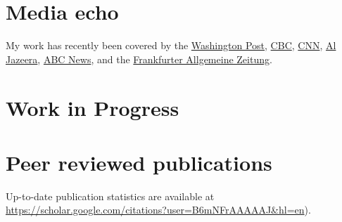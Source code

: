 \documentclass[11pt,a4paper,sans]{moderncv}
\begin{document}


\section{Media echo}

My work has recently been covered by the \href{https://www.washingtonpost.com/climate-environment/2021/10/11/85-percent-population-climate-impacts/}{Washington Post}, \href{https://www.cbc.ca/news/science/global-south-climate-science-1.6212471}{CBC}, \href{https://edition.cnn.com/2021/10/11/world/climate-change-attribution-gap/index.html}{CNN}, \href{https://www.aljazeera.com/news/2021/10/11/climate-change-may-already-affect-85-percent-of-humanity-report}{Al Jazeera}, \href{https://abcnews.go.com/US/human-induced-climate-change-affect-85-global-population/story?id=80523851}{ABC News}, and the \href{https://www.faz.net/aktuell/wissen/erde-klima/kuenstliche-intelligenz-zeigt-weltweite-auswirkungen-des-klimawandels-17613824.html}{Frankfurter Allgemeine Zeitung}.

\section{Work in Progress}




\section{Peer reviewed publications}

 Up-to-date publication statistics are available at  \url{https://scholar.google.com/citations?user=B6mNFrAAAAAJ&hl=en}).
\end{document}
